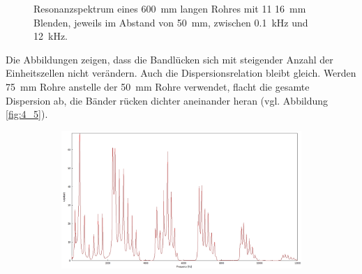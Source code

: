 \begin{figure}
\begin{subfigure}{0.34\textwidth}
\end{subfigure}
\caption{Resonanzspektrum eines 600~mm langen Rohres mit 11 16~mm Blenden, jeweils im Abstand von 50~mm, zwischen 0.1~kHz und 12~kHz.}
\label{fig:4_4_12}
\end{figure}
Die Abbildungen zeigen, dass die Bandlücken sich mit steigender Anzahl der Einheitszellen nicht verändern. 
Auch die Dispersionsrelation bleibt gleich.
Werden 75~mm Rohre anstelle der 50~mm Rohre verwendet, flacht die gesamte Dispersion ab, die Bänder rücken dichter aneinander heran (vgl. Abbildung \ref{fig:4_5}).
\begin{figure}
\centering
\begin{subfigure}{0.65\textwidth}
\includegraphics[width=\textwidth]{content/messungen/Chapter4/4_5.jpg}
\end{subfigure}
\begin{subfigure}{0.34\textwidth}

\end{subfigure}
\end{figure}
